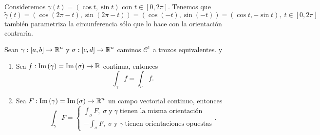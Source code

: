 \begin{eg}
	Consideremos $\displaystyle \gamma\left(t\right)=\left(\cos t, \sin t\right) $ con $\displaystyle t \in \left[0, 2\pi \right]  $. Tenemos que 
	\[\tilde{\gamma}\left(t\right)=\left(\cos\left(2\pi -t\right), \sin\left(2\pi - t\right)\right)=\left(\cos\left(-t\right), \sin\left(-t\right)\right)=\left(\cos t, - \sin t\right), \; t \in \left[0,2\pi \right]  \]
	también parametriza la circunferencia sólo que lo hace con la orientación contraria.
\end{eg}
\begin{theorem}
	Sean $\displaystyle \gamma:\left[a,b\right] \to \mathbb{R}^{n} $ y $\displaystyle \sigma : \left[c,d\right] \to \mathbb{R}^{n} $ caminos $\displaystyle \mathcal{C}^{1} $ a trozos equivalentes. y  
	\begin{enumerate}
	\item Sea $\displaystyle f : \operatorname{Im}\left(\gamma \right)=\operatorname{Im}\left(\sigma \right)\to \mathbb{R} $ continua, entonces  
		\[ \int _{\gamma }f =\int _{\sigma }f.\]
	\item Sea $\displaystyle F : \operatorname{Im}\left(\gamma \right)=\operatorname{Im}\left(\sigma \right)\to \mathbb{R}^{n} $ un campo vectorial continuo, entonces
		\[\int _{\gamma }F =
		\begin{cases}
		\int _{\sigma }F , \; \sigma \; \text{y} \; \gamma \; \text{tienen la misma orientación} \\
		-\int _{\sigma }F , \; \sigma \; \text{y} \; \gamma \; \text{tienen orientaciones opuestas}
		\end{cases}
		.\]
	\end{enumerate}
\end{theorem}
